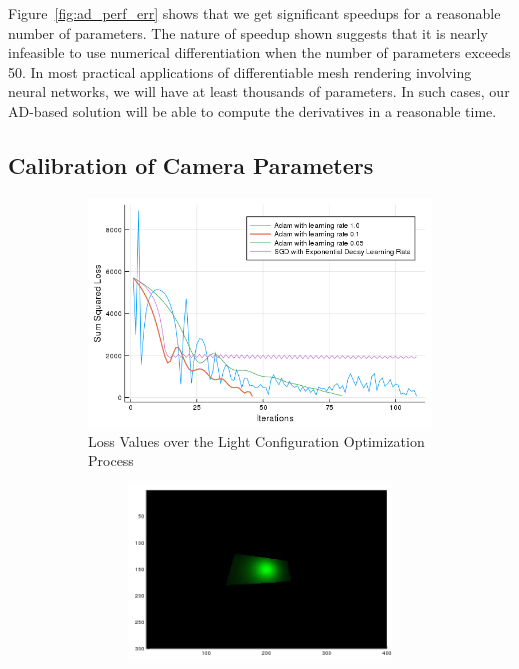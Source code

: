 \documentclass{juliacon}
\begin{document}
Figure~\ref{fig:ad_perf_err} shows that we get significant speedups for a reasonable number of parameters. The nature of speedup shown suggests that it is nearly infeasible to use numerical differentiation when the number of parameters exceeds 50. In most practical applications of differentiable mesh rendering involving neural networks, we will have at least thousands of parameters. In such cases, our AD-based solution will be able to compute the derivatives in a reasonable time.

\subsection{Calibration of Camera Parameters}
\label{sec:calcam}

\begin{figure}[!htb]
    \centering
    \begin{subfigure}[c]{0.45\textwidth}
        \includegraphics[width=\linewidth]{images/camera/loss_plot.png}
        \caption{Loss Values over the Light Configuration Optimization Process}
        \label{fig:cam_curve}
    \end{subfigure}
    \hfill
    \begin{subfigure}[c]{0.45\textwidth}
        \begin{subfigure}[c]{0.45\textwidth}
            \centering
            \includegraphics[width=\textwidth]{images/camera/initial_guess_image.png}

\end{subfigure}
\end{subfigure}
\end{figure}
\end{document}
